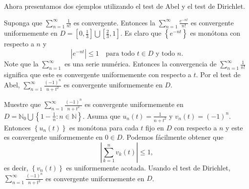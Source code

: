 Ahora presentamos dos ejemplos utilizando el test de Abel y el test de Dirichlet.
\begin{example}
	Suponga que $\sum_{n=1}^{\infty}\frac{1}{n!}$ es convergente. Entonces la $\sum_{n=1}^{\infty}\frac{e^{-nt}}{n!}$ es convergente uniformemente en $D=\left[0,\frac{1}{3}\right]\bigcup\left[\frac{2}{3},1\right]$. Es claro que $\left\{e^{-nt}\right\}$ es monótona con respecto a $n$ y \[ \left|e^{-nt}\right|\leq1\quad\text{para todo }t\in D\text{ y todo }n. \] Note que la $\sum_{n=1}^{\infty}$ es una serie numérica. Entonces la convergencia de $\sum_{n=1}^{\infty}\frac{1}{n!}$ significa que este es convergente uniformemente con respecto a $t$. Por el test de Abel, $\sum_{n=1}^{\infty}\frac{{\left(-1\right)}^{n}}{n+t^{2}}$ es convergente uniformemente en $D$.
\end{example}
\begin{example}
	Muestre que $\sum_{n=1}^{\infty}\frac{{\left(-1\right)}^{n}}{n+t^{2}}$ es convergente uniformemente en $D=\mathds{N}_{0}\bigcup\left\{1-\frac{1}{n}:n\in\mathds{N}\right\}$. Asuma que $u_{n}\left(t\right)=\frac{1}{n+t^{2}}$ y $v_{n}\left(t\right)={\left(-1\right)}^{n}$. Entonces $\left\{u_{n}\left(t\right)\right\}$ es monótona para cada $t$ fijo en $D$ con respecto a $n$ y este es convergente uniformemente en $0\in D$. Podemos fácilmente obtener que \[ \left|\sum_{k=1}^{n}v_{k}\left(t\right)\right|\leq1, \] es decir, $\left\{v_{n}\left(t\right)\right\}$ es uniformemente acotada. Usando el test de Dirichlet, $\sum_{n=1}^{\infty}\frac{{\left(-1\right)}^{n}}{n+t^{2}}$ es convergente uniformemente en $D$.
\end{example}
%

%
%	
%	
